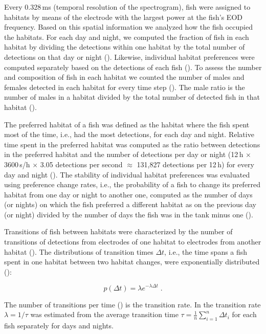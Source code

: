 Every 0.328\,ms (temporal resolution of the spectrogram), fish were assigned to habitats by means of the electrode with the largest power at the fish's EOD frequency. Based on this spatial information we analyzed how the fish occupied the habitats. For each day and night, we computed the fraction of fish in each habitat by dividing the detections within one habitat by the total number of detections on that day or night (). Likewise, individual habitat preferences were computed separately based on the detections of each fish (). To assess the number and composition of fish in each habitat we counted the number of males and females detected in each habitat for every time
step (). The male ratio is the number of males in a habitat divided by the total number of detected fish in that habitat ().

The preferred habitat of a fish was defined as the habitat where the fish spent most of the time, i.e., had the most detections, for each day and night. Relative time spent in the preferred habitat was computed as the ratio between detections in the preferred habitat and the number of detections per day or night (12\,h $\times$ 3600\,s/h $\times$ 3.05 detections per second $\approx$ 131,827 detections per 12\,h) for every day and night (). The stability of individual habitat preferences was evaluated using preference change rates, i.e., the probability of a fish to change its preferred habitat from one day or night to another one, computed as the number of days (or nights) on which the fish preferred a different habitat as on the previous day (or night) divided by the number of days the fish was in the tank minus one ().

Transitions of fish between habitats were characterized by the number of transitions of detections from electrodes of one habitat to electrodes from another habitat (). The distributions of transition times $\Delta t$, i.e., the time spans a fish spent in one habitat between two habitat changes, were exponentially distributed ():
\begin{linenomath}
  \begin{equation}
    \label{expdist}
    p(\Delta t) = \lambda e^{-\lambda \Delta t} \; .
  \end{equation}
\end{linenomath}
The number of transitions per time () is the
transition rate. In  the transition rate
$\lambda=1/\tau$ was estimated from the average transition time $\tau
= \frac{1}{n} \sum_{i=1}^n \Delta t_i$ for each fish separately for
days and nights.

